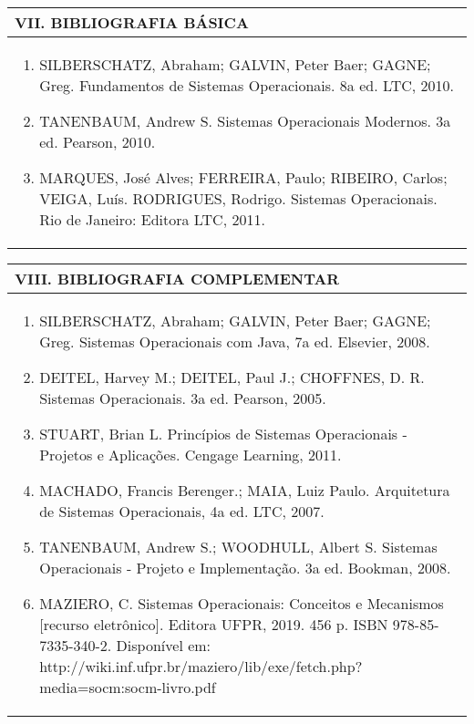 \documentclass[12pt]{article}
\begin{document}
\begin{longtable}{|L{1.025\textwidth}|} \hline
%
{\bf VII. BIBLIOGRAFIA BÁSICA} \\ \hline

\begin{enumerate}
\item  SILBERSCHATZ, Abraham; GALVIN, Peter Baer; GAGNE; Greg. Fundamentos de Sistemas Operacionais. 8a ed. LTC, 2010. 
\item TANENBAUM, Andrew S. Sistemas Operacionais Modernos. 3a ed. Pearson, 2010. 
\item MARQUES, José Alves; FERREIRA, Paulo; RIBEIRO, Carlos; VEIGA, Luís. RODRIGUES, Rodrigo. Sistemas Operacionais. Rio de Janeiro: Editora LTC, 2011.

\end{enumerate}
 \\ \hline
\end{longtable}



\begin{longtable}{|L{1.025\textwidth}|} \hline
%
{\bf VIII. BIBLIOGRAFIA COMPLEMENTAR} \\ \hline
\begin{enumerate}
\item SILBERSCHATZ, Abraham; GALVIN, Peter Baer; GAGNE; Greg. Sistemas Operacionais com Java, 7a ed. Elsevier, 2008. 
\item DEITEL, Harvey M.; DEITEL, Paul J.; CHOFFNES, D. R. Sistemas Operacionais. 3a ed. Pearson, 2005. 
\item STUART, Brian L. Princípios de Sistemas Operacionais - Projetos e Aplicações. Cengage Learning, 2011. 
\item MACHADO, Francis Berenger.; MAIA, Luiz Paulo. Arquitetura de Sistemas Operacionais, 4a ed. LTC, 2007. 
\item  TANENBAUM, Andrew S.; WOODHULL, Albert S. Sistemas Operacionais - Projeto e Implementação. 3a ed. Bookman, 2008.

\item MAZIERO, C. Sistemas Operacionais: Conceitos e Mecanismos [recurso eletrônico]. Editora UFPR, 2019. 456 p. ISBN 978-85-7335-340-2. Disponível em: http://wiki.inf.ufpr.br/maziero/lib/exe/fetch.php?media=socm:socm-livro.pdf


\end{enumerate}
 \\ \hline
\end{longtable}




\end{document}
